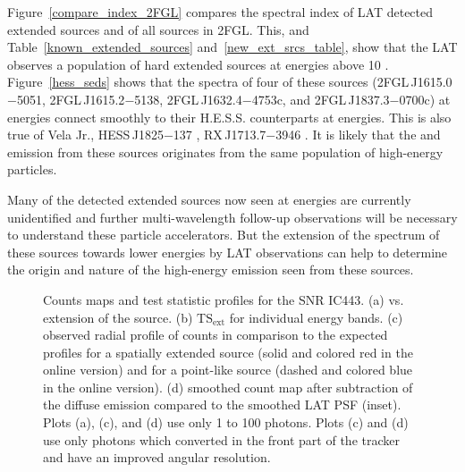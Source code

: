 \documentclass[12pt,preprint]{aastex}
\newif\ifcolorfigure
\newcommand{\gev}{\text{GeV}\xspace}
\newcommand{\tev}{\text{TeV}\xspace}
\newcommand{\tsext}{{\ensuremath{\text{TS}_{\text{ext}}}}\xspace}
\newcommand{\ts}{\text{TS}\xspace}
\begin{document}
{Figure~\ref{compare_index_2FGL} compares the spectral index
of LAT detected extended sources and of all sources in 2FGL. This,
and Table~\ref{known_extended_sources} and~\ref{new_ext_srcs_table},
show that the LAT observes a population of hard extended sources at
energies above 10 \gev.  Figure~\ref{hess_seds} shows that the
spectra of four of these sources (2FGL\,J1615.0$-$5051, 2FGL\,J1615.2$-$5138,
2FGL\,J1632.4$-$4753c, and 2FGL\,J1837.3$-$0700c)  
at \gev energies
connect smoothly to their H.E.S.S. counterparts at \tev
energies. This is also true of Vela
Jr., HESS\,J1825$-$137 \citep{fermi_hess_j1825}, RX\,J1713.7$-$3946
\citep{rx_j1713_lat}.  It is likely that the \gev and \tev emission
from these sources originates from the same population of high-energy
particles.

Many of the \tev detected extended sources now seen at \gev energies are
currently unidentified and further multi-wavelength follow-up observations
will be necessary to understand these particle accelerators.  But the
extension of the spectrum of these \tev sources towards lower energies
by LAT observations can help to determine the origin and nature of the
high-energy emission seen from these sources.
}




\clearpage
\begin{figure}
    \ifcolorfigure
    \plotone{ic443_plots/four_plots_ic443_color.eps}
    \else
    \fi
    \caption{
    Counts maps and test statistic profiles for the SNR IC443. (a) \ts
    vs. extension of the source. (b) \tsext for individual energy
    bands. (c) observed radial profile of counts in comparison to the
    expected profiles for a spatially extended source (solid and colored
    red in the online version) and for a point-like source (dashed and colored
    blue in the online version).  (d) smoothed count map after subtraction
    of the diffuse emission compared to the smoothed
    LAT PSF (inset).  Plots (a),
    (c), and (d) use only 1 \gev to 100 \gev photons.  Plots (c) and (d) use
    only photons which converted in the front part of the tracker and
    have an improved angular resolution.
    }
    \label{four_plots_ic443}
\end{figure}
\end{document}
